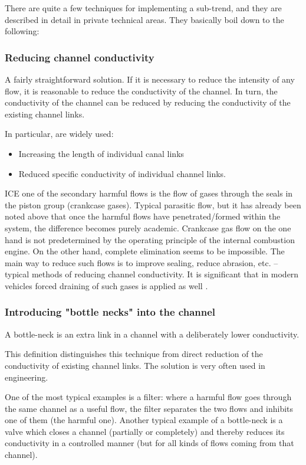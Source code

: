 \documentclass[a4paper,11pt]{article}
\begin{document}
There are quite a few techniques for implementing a sub-trend, and they are
described in detail in private technical areas. They basically boil down to
the following:

\subsubsection{Reducing channel conductivity}

A fairly straightforward solution. If it is necessary to reduce the intensity
of any flow, it is reasonable to reduce the conductivity of the channel. In
turn, the conductivity of the channel can be reduced by reducing the
conductivity of the existing channel links.

In particular, are widely used:
\begin{itemize}
\item Increasing the length of individual canal links
\item Reduced specific conductivity of individual channel links.
\end{itemize}
ICE one of the secondary harmful flows is the flow of gases through the seals
in the piston group (crankcase gases). Typical parasitic flow, but it has
already been noted above that once the harmful flows have penetrated/formed
within the system, the difference becomes purely academic. Crankcase gas flow
on the one hand is not predetermined by the operating principle of the
internal combustion engine. On the other hand, complete elimination seems to
be impossible. The main way to reduce such flows is to improve sealing, reduce
abrasion, etc. -- typical methods of reducing channel conductivity. It is
significant that in modern vehicles forced draining of such gases is applied
as well \cite{B19}.

\subsubsection{Introducing "bottle necks" into the channel}

A bottle-neck is an extra link in a channel with a deliberately lower
conductivity.

This definition distinguishes this technique from direct reduction of the
conductivity of existing channel links. The solution is very often used in
engineering.

One of the most typical examples is a filter: where a harmful flow goes
through the same channel as a useful flow, the filter separates the two flows
and inhibits one of them (the harmful one). Another typical example of a
bottle-neck is a valve which closes a channel (partially or completely) and
thereby reduces its conductivity in a controlled manner (but for all kinds of
flows coming from that channel).
\end{document}

